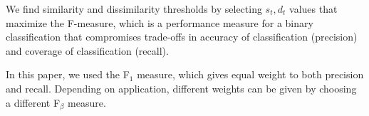 We find similarity and dissimilarity thresholds by selecting $s_t,d_t$ values that maximize the F-measure,
which is a performance measure for a binary classification that compromises trade-offs in accuracy of classification (precision) and coverage of classification (recall).

In this paper, we used the F$_1$ measure, which gives equal weight to both precision and recall.
Depending on application, different weights can be given by choosing a different F$_\beta$ measure.






